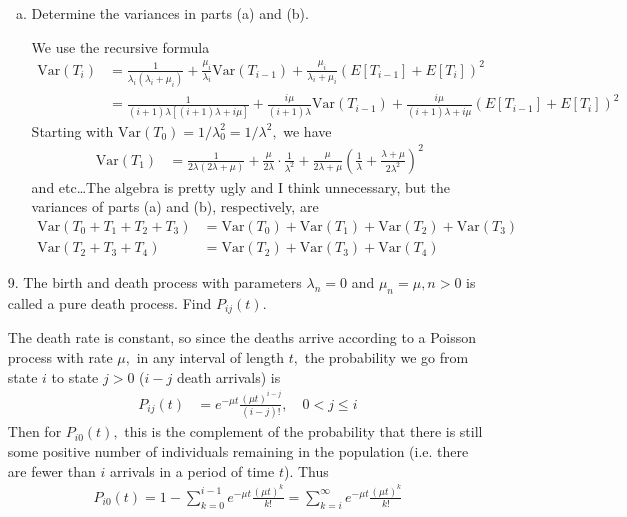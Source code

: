 \documentclass{article}
\newcommand{\var}{\mathrm{Var}}
\begin{document}
\begin{itemize}
\begin{enumerate}[(a)]
			\item Determine the variances in parts (a) and (b).
				\begin{soln}
					We use the recursive formula
					\begin{align*}
						\var(T_i) &= \frac{1}{\lambda_i(\lambda_i+\mu_i)} + \frac{\mu_i}{\lambda_i}\var(T_{i-1}) + \frac{\mu_i}{\lambda_i+\mu_i}\left( E[T_{i-1}] + E[T_i] \right)^2 \\
						&= \frac{1}{(i+1)\lambda\left[ (i+1)\lambda+i\mu \right]} + \frac{i\mu}{(i+1)\lambda} \var(T_{i-1}) + \frac{i\mu}{(i+1)\lambda+i\mu}\left( E[T_{i-1}] + E[T_i] \right)^2
					\end{align*}
					Starting with $\var(T_0) = 1/\lambda_0^2 = 1/\lambda^2,$ we have
					\begin{align*}
						\var(T_1) &= \frac{1}{2\lambda(2\lambda+\mu)} + \frac{\mu}{2\lambda}\cdot \frac{1}{\lambda^2} + \frac{\mu}{2\lambda+\mu} \left( \frac{1}{\lambda} + \frac{\lambda+\mu}{2\lambda^2} \right)^2
					\end{align*}
					and etc\ldots The algebra is pretty ugly and I think unnecessary, but the variances of parts (a) and (b), respectively, are
					\begin{align*}
						\var(T_0+T_1+T_2+T_3) &= \var(T_0) + \var(T_1) + \var(T_2) + \var(T_3) \\
						\var(T_2+T_3+T_4) &= \var(T_2) + \var(T_3) + \var(T_4)
					\end{align*}
				\end{soln}

		\end{enumerate}

	\item[9.] The birth and death process with parameters $\lambda_n=0$ and $\mu_n=\mu, n>0$ is called a pure death process. Find $P_{ij}(t).$
		\begin{soln}
			The death rate is constant, so since the deaths arrive according to a Poisson process with rate $\mu,$ in any interval of length $t,$ the probability we go from state $i$ to state $j>0$ ($i-j$ death arrivals) is
			\begin{align*}
				P_{ij}(t) &= e^{-\mu t} \frac{(\mu t)^{i-j}}{(i-j)!}, \quad 0<j\le i
			\end{align*}
			Then for $P_{i0}(t),$ this is the complement of the probability that there is still some positive number of individuals remaining in the population (i.e. there are fewer than $i$ arrivals in a period of time $t$). Thus
			\begin{align*}
				P_{i0}(t) = 1-\sum_{k=0}^{i-1} e^{-\mu t} \frac{(\mu t)^k}{k!} = \sum_{k=i}^{\infty} e^{-\mu t} \frac{(\mu t)^k}{k!}
			\end{align*}
		\end{soln}

\end{itemize}
\end{document}
